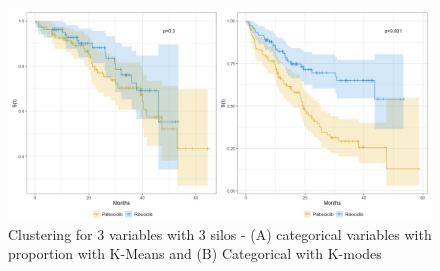 \begin{figure}[ht]
  \caption{Clustering for 3 variables with 3 silos - (A) categorical variables with  proportion with K-Means and (B)  Categorical with K-modes  }\label{fig:propensity} 
  \includegraphics[width=\linewidth]{figures/propensity_score_both.jpeg}%

\end{figure}
